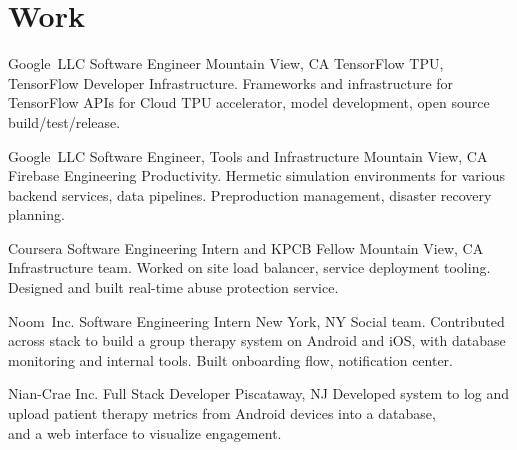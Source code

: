 \documentclass[11pt,letterpaper]{moderncv}
\begin{document}
\maketitle

\section{Work}

        {Google~LLC}
        {Software Engineer}
        {Mountain View, CA}
        {}
        {TensorFlow TPU, TensorFlow Developer Infrastructure. Frameworks and infrastructure for TensorFlow APIs for Cloud TPU accelerator, model development, open source build/test/release. \\}

        {Google~LLC}
        {Software Engineer, Tools and Infrastructure}
        {Mountain View, CA}
        {}
        {Firebase Engineering Productivity. Hermetic simulation environments for various backend services, data pipelines. Preproduction management, disaster recovery planning.\\}

        {Coursera}
        {Software Engineering Intern and KPCB Fellow}
        {Mountain View, CA}
        {}
        {Infrastructure team. Worked on site load balancer, service deployment tooling. \\Designed and built real-time abuse protection service. \\}

        {Noom~Inc.}
        {Software Engineering Intern}
        {New York, NY}
        {}
        {Social team. Contributed across stack to build a group therapy system on Android and iOS, with database monitoring and internal tools. Built onboarding flow, notification center.\\}

        {Nian-Crae Inc.}
        {Full Stack Developer}
        {Piscataway, NJ}
        {}
        {Developed system to log and upload patient therapy metrics from Android devices into a database,\\and a web interface to visualize engagement.\\}

\end{document}
